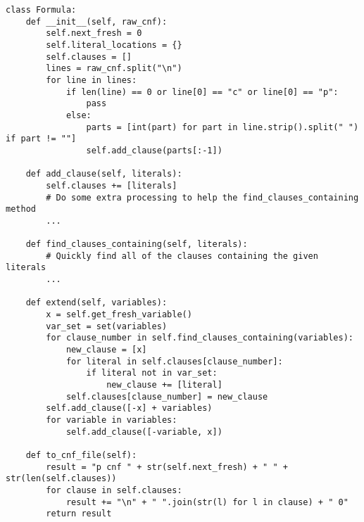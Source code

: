 \begin{minipage}{\textwidth+2cm}
  \begin{lstlisting}
class Formula:
    def __init__(self, raw_cnf):
        self.next_fresh = 0
        self.literal_locations = {}
        self.clauses = []
        lines = raw_cnf.split("\n")
        for line in lines:
            if len(line) == 0 or line[0] == "c" or line[0] == "p":
                pass
            else:
                parts = [int(part) for part in line.strip().split(" ") if part != ""]
                self.add_clause(parts[:-1])

    def add_clause(self, literals):
        self.clauses += [literals]
        # Do some extra processing to help the find_clauses_containing method
        ...

    def find_clauses_containing(self, literals):
        # Quickly find all of the clauses containing the given literals
        ...

    def extend(self, variables):
        x = self.get_fresh_variable()
        var_set = set(variables)
        for clause_number in self.find_clauses_containing(variables):
            new_clause = [x]
            for literal in self.clauses[clause_number]:
                if literal not in var_set:
                    new_clause += [literal]
            self.clauses[clause_number] = new_clause
        self.add_clause([-x] + variables)
        for variable in variables:
            self.add_clause([-variable, x])

    def to_cnf_file(self):
        result = "p cnf " + str(self.next_fresh) + " " + str(len(self.clauses))
        for clause in self.clauses:
            result += "\n" + " ".join(str(l) for l in clause) + " 0"
        return result
  \end{lstlisting}
\end{minipage}%
